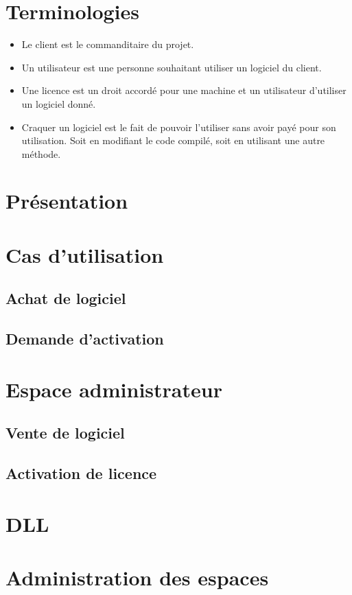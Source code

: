 \chapter{Terminologies}

\begin{itemize}
	\item Le client est le commanditaire du projet.
	\item Un utilisateur est une personne souhaitant utiliser un logiciel du client. 
	\item Une licence est un droit accordé pour une machine et un utilisateur d'utiliser un logiciel donné.
	\item Craquer un logiciel est le fait de pouvoir l'utiliser sans avoir payé pour son utilisation. 
	Soit en modifiant le code compilé, soit en utilisant une autre méthode. 
\end{itemize}

\chapter{Présentation}

\chapter{Cas d'utilisation}

\section{Achat de logiciel}

\section{Demande d'activation}

\chapter{Espace administrateur}

\section{Vente de logiciel}

\section{Activation de licence}

\chapter{DLL}

\chapter{Administration des espaces}
\label{chapter:bilan}

